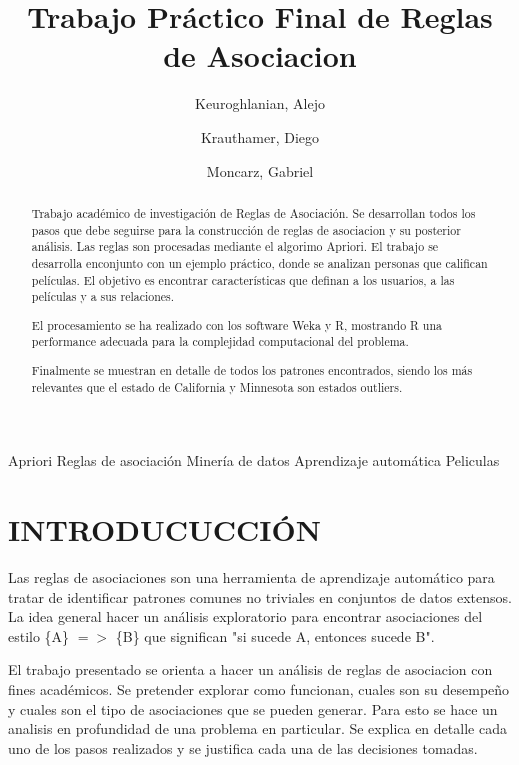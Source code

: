 \documentclass[journal]{IEEEtran}
\begin{document}
\title{Trabajo Práctico Final de Reglas de Asociacion}
\author{
	Keuroghlanian, Alejo \\
	\and
	Krauthamer, Diego \\
	\and
	Moncarz, Gabriel}
\maketitle %

\begin{abstract}
Trabajo académico de investigación de Reglas de Asociación. Se desarrollan
todos los pasos que debe seguirse para la construcción de reglas de asociacion
y su posterior análisis. Las reglas son procesadas mediante el algorimo Apriori.
El trabajo se desarrolla enconjunto con  un ejemplo
práctico, donde se analizan personas que califican películas. El objetivo es encontrar 
características que definan a los usuarios, a las películas y a sus
relaciones. 

El procesamiento se ha realizado con los software
Weka y R, mostrando R una performance
adecuada para la complejidad computacional del problema.

Finalmente se muestran en detalle de todos los patrones encontrados, siendo los más
relevantes que el estado de California y Minnesota son estados outliers.
\end{abstract}

\begin{IEEEkeywords}
Apriori
Reglas de asociación
Minería de datos
Aprendizaje automática
Peliculas
\end{IEEEkeywords}







\section{INTRODUCUCCIÓN}

Las reglas de asociaciones son una herramienta de aprendizaje automático para
tratar de identificar patrones comunes no triviales en conjuntos de datos
extensos. La idea general hacer un análisis exploratorio para  encontrar 
asociaciones del estilo \{A\} $=$$>$ \{B\} que significan 
"si sucede A, entonces sucede B". 

El trabajo presentado se orienta a hacer un análisis de reglas de asociacion con
fines académicos. Se pretender explorar como funcionan, cuales son  su desempeño y
cuales son el tipo de asociaciones que se pueden generar. Para esto se
hace un analisis en profundidad de una problema en particular. Se
explica en detalle cada uno de los pasos realizados y se justifica cada una de 
las decisiones tomadas.
\end{document}
